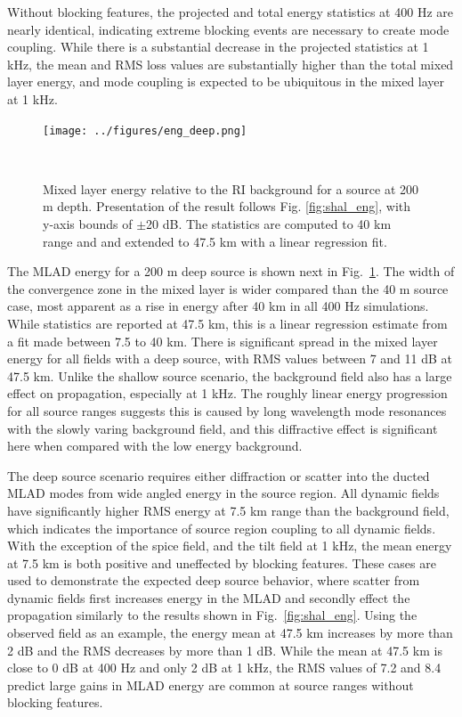 \documentclass[preprint,NumberedRefs]{JASA}
\begin{document}
Without blocking features, the projected and total energy statistics at 400 Hz are nearly identical, indicating extreme blocking events are necessary to create mode coupling. While there is a substantial decrease in the projected statistics at 1 kHz, the mean and RMS loss values are substantially higher than the total mixed layer energy, and mode coupling is expected to be ubiquitous in the mixed layer at 1 kHz.

\begin{figure}
\texttt{[image: ../figures/eng\_deep.png]}
    \caption{Mixed layer energy relative to the RI background for a source at 200 m depth. Presentation of the result follows Fig. \ref{fig:shal_eng}, with y-axis bounds of $\pm$20 dB. The statistics are computed to 40 km range and and extended to 47.5 km with a linear regression fit.}
    \label{fig:deep_eng}
\end{figure}
The MLAD energy for a 200 m deep source is shown next in Fig.~\ref{fig:deep_eng}. The width of the convergence zone in the mixed layer is wider compared than the 40 m source case, most apparent as a rise in energy after 40 km in all 400 Hz simulations. While statistics are reported at 47.5 km, this is a linear regression estimate from a fit made between 7.5 to 40 km. There is significant spread in the mixed layer energy for all fields with a deep source, with RMS values between 7 and 11 dB at 47.5 km. Unlike the shallow source scenario, the background field also has a large effect on propagation, especially at 1 kHz. The roughly linear energy progression for all source ranges suggests this is caused by long wavelength mode resonances with the slowly varing background field\cite{colosi21}, and this diffractive effect is significant here when compared with the low energy background.

The deep source scenario requires either diffraction or scatter into the ducted MLAD modes from wide angled energy in the source region. All dynamic fields have significantly higher RMS energy at 7.5 km range than the background field, which indicates the importance of source region coupling to all dynamic fields. With the exception of the spice field, and the tilt field at 1 kHz, the mean energy at 7.5 km is both positive and uneffected by blocking features. These cases are used to demonstrate the expected deep source behavior, where scatter from dynamic fields first increases energy in the MLAD and secondly effect the propagation similarly to the results shown in Fig.~\ref{fig:shal_eng}. Using the observed field as an example, the energy mean at 47.5 km increases by more than 2 dB and the RMS decreases by more than 1 dB. While the mean at 47.5 km is close to 0 dB at 400 Hz and only 2 dB at 1 kHz, the RMS values of 7.2 and 8.4 predict large gains in MLAD energy are common at source ranges without blocking features.
\end{document}
